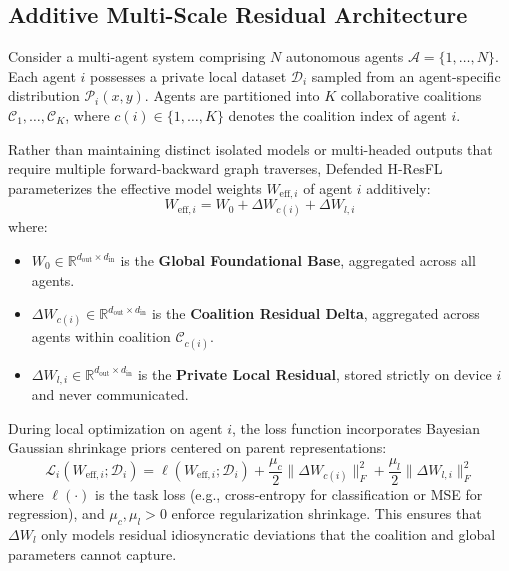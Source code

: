 \documentclass[sigconf]{acmart}
\begin{document}
\subsection{Additive Multi-Scale Residual Architecture}
Consider a multi-agent system comprising $N$ autonomous agents $\mathcal{A} = \{1, \dots, N\}$. Each agent $i$ possesses a private local dataset $\mathcal{D}_i$ sampled from an agent-specific distribution $\mathcal{P}_i(x, y)$. Agents are partitioned into $K$ collaborative coalitions $\mathcal{C}_1, \dots, \mathcal{C}_K$, where $c(i) \in \{1, \dots, K\}$ denotes the coalition index of agent $i$.

Rather than maintaining distinct isolated models or multi-headed outputs that require multiple forward-backward graph traverses, Defended H-ResFL parameterizes the effective model weights $W_{\text{eff}, i}$ of agent $i$ additively:
\begin{equation}
\label{eq:residual_param}
W_{\text{eff}, i} = W_0 + \Delta W_{c(i)} + \Delta W_{l, i}
\end{equation}
where:
\begin{itemize}
    \item $W_0 \in \mathbb{R}^{d_{\text{out}} \times d_{\text{in}}}$ is the \textbf{Global Foundational Base}, aggregated across all agents.
    \item $\Delta W_{c(i)} \in \mathbb{R}^{d_{\text{out}} \times d_{\text{in}}}$ is the \textbf{Coalition Residual Delta}, aggregated across agents within coalition $\mathcal{C}_{c(i)}$.
    \item $\Delta W_{l, i} \in \mathbb{R}^{d_{\text{out}} \times d_{\text{in}}}$ is the \textbf{Private Local Residual}, stored strictly on device $i$ and never communicated.
\end{itemize}

During local optimization on agent $i$, the loss function incorporates Bayesian Gaussian shrinkage priors centered on parent representations:
\begin{equation}
\label{eq:agent_loss}
\mathcal{L}_i(W_{\text{eff}, i}; \mathcal{D}_i) = \ell(W_{\text{eff}, i}; \mathcal{D}_i) + \frac{\mu_c}{2} \|\Delta W_{c(i)}\|_F^2 + \frac{\mu_l}{2} \|\Delta W_{l, i}\|_F^2
\end{equation}
where $\ell(\cdot)$ is the task loss (e.g., cross-entropy for classification or MSE for regression), and $\mu_c, \mu_l > 0$ enforce regularization shrinkage. This ensures that $\Delta W_l$ only models residual idiosyncratic deviations that the coalition and global parameters cannot capture.
\end{document}
